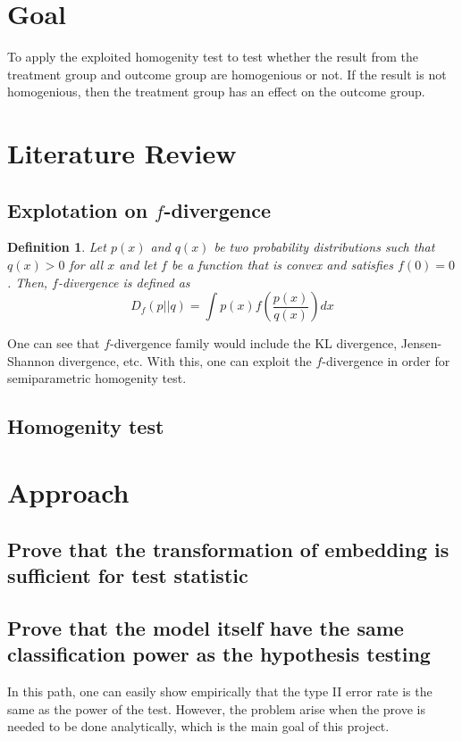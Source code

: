 \documentclass{article}
\newtheorem{definition}{Definition}
\begin{document}
\section{Goal}

To apply the exploited homogenity test to test whether the result from the treatment group and outcome group
are homogenious or not. If the result is not homogenious, then the treatment group has an effect on the outcome group.
\section{Literature Review}

\subsection{Explotation on $f$-divergence}

\begin{definition}
Let $p(x)$ and $q(x)$ be two probability distributions such that $q(x) > 0$ for all $x$ and 
let $f$ be a function that is convex and satisfies $f(0)=0$. Then, $f$-divergence is defined as
\begin{equation}
    D_f(p||q) = \int p(x) f\left(\frac{p(x)}{q(x)}\right) dx
\end{equation}
\end{definition}
One can see that $f$-divergence family would include the KL divergence, Jensen-Shannon divergence, etc.
With this, one can exploit the $f$-divergence in order for semiparametric homogenity test.

\subsection{Homogenity test}


\section{Approach}

\subsection{Prove that the transformation of embedding is sufficient for test statistic}
\subsection{Prove that the model itself have the same classification power as the hypothesis testing}
In this path, one can easily show empirically that the type II error rate is the same as the 
power of the test. However, the problem arise when the prove is needed to be done analytically, 
which is the main goal of this project. 

\end{document}
